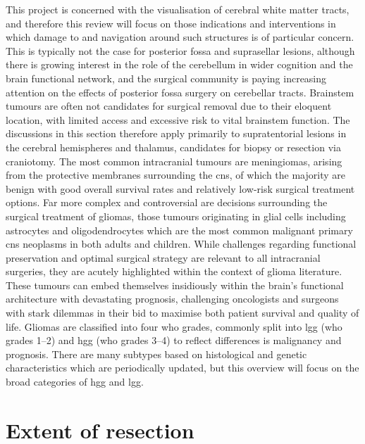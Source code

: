 This project is concerned with the visualisation of cerebral white matter tracts, and therefore this review will focus on those indications and interventions in which damage to and navigation around such structures is of particular concern.
This is typically not the case for posterior fossa and suprasellar lesions, although there is growing interest in the role of the cerebellum in wider cognition and the brain functional network, and the surgical community is paying increasing attention on the effects of posterior fossa surgery on cerebellar tracts\autocite{Toescu2021,Skye2023}.
Brainstem tumours are often not candidates for surgical removal due to their eloquent location, with limited access and excessive risk to vital brainstem function.
The discussions in this section therefore apply primarily to supratentorial lesions in the cerebral hemispheres and thalamus, candidates for biopsy or resection via craniotomy.
The most common intracranial tumours are meningiomas, arising from the protective membranes surrounding the \gls{cns}, of which the majority are benign with good overall survival rates and relatively low-risk surgical treatment options\autocite{Rogers2015,Spena2022}.
Far more complex and controversial are decisions surrounding the surgical treatment of gliomas, those tumours originating in glial cells including astrocytes and oligodendrocytes which are the most common malignant primary \gls{cns} neoplasms in both adults\autocite{Ostrom2015,Wanis2021} and children\autocite{Ostrom2015,Bauchet2009}.
While challenges regarding functional preservation and optimal surgical strategy are relevant to all intracranial surgeries, they are acutely highlighted within the context of glioma literature.
These tumours can embed themselves insidiously within the brain's functional architecture with devastating prognosis, challenging oncologists and surgeons with stark dilemmas in their bid to maximise both patient survival and quality of life.
Gliomas are classified into four \gls{who} grades, commonly split into \gls{lgg} (\gls{who} grades 1--2) and \gls{hgg} (\gls{who} grades 3--4) to reflect differences is malignancy and prognosis.
There are many subtypes based on histological and genetic characteristics which are periodically updated\autocite{Louis2021}, but this overview will focus on the broad categories of \gls{hgg} and \gls{lgg}.

\section{Extent of resection}\label{sec:eor}

